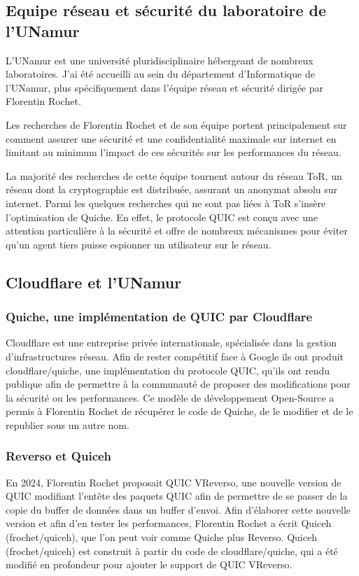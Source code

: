 \subsection{Equipe réseau et sécurité du laboratoire de l'UNamur}

L'UNamur est une université pluridisciplinaire hébergeant de nombreux laboratoires. J'ai été accueilli au sein du département d'Informatique de l'UNamur, plus spécifiquement dans l'équipe réseau et sécurité dirigée par Florentin Rochet.

Les recherches de Florentin Rochet et de son équipe portent principalement sur comment assurer une sécurité et une confidentialité maximale sur internet en limitant au minimum l'impact de ces sécurités sur les performances du réseau.

La majorité des recherches de cette équipe tournent autour du réseau ToR, un réseau dont la cryptographie est distribuée, assurant un anonymat absolu sur internet. Parmi les quelques recherches qui ne sont pas liées à ToR s'insère l'optimisation de Quiche. En effet, le protocole QUIC est conçu avec une attention particulière à la sécurité et offre de nombreux mécanismes pour éviter qu'un agent tiers puisse espionner un utilisateur sur le réseau.

\subsection{Cloudflare et l'UNamur}

\subsubsection{Quiche, une implémentation de QUIC par Cloudflare}

    Cloudflare est une entreprise privée internationale, spécialisée dans la gestion d'infrastructures réseau. Afin de rester compétitif face à Google ils ont produit cloudflare/quiche, une implémentation du protocole QUIC, qu'ils ont rendu publique afin de permettre à la communauté de proposer des modifications pour la sécurité ou les performances. Ce modèle de développement Open-Source a permis à Florentin Rochet de récupérer le code de Quiche, de le modifier et de le republier sous un autre nom.

\subsubsection{Reverso et Quiceh}

    En 2024, Florentin Rochet proposait QUIC VReverso, une nouvelle version de QUIC modifiant l'entête des paquets QUIC afin de permettre de se passer de la copie du buffer de données dans un buffer d'envoi.
    Afin d'élaborer cette nouvelle version et afin d'en tester les performances, Florentin Rochet a écrit Quiceh (frochet/quiceh), que l'on peut voir comme Quiche plus Reverso. Quiceh (frochet/quiceh) est construit à partir du code de cloudflare/quiche, qui a été modifié en profondeur pour ajouter le support de QUIC VReverso.